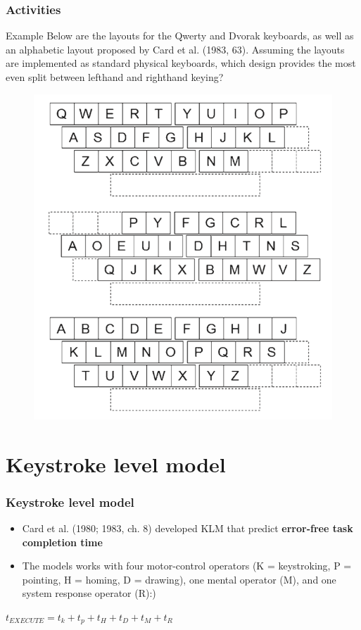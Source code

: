 \documentclass{beamer}
\begin{document}
\begin{frame}
\frametitle{Activities}
\begin{block}{Example}
	\footnotesize
	Below are the layouts for the Qwerty and Dvorak keyboards, as well as an alphabetic layout proposed by Card et al. (1983, 63). Assuming the layouts are implemented as standard physical keyboards, which design provides the most even split between lefthand and righthand keying?
\end{block}
	\begin{figure}
		\centering
		\includegraphics[width=.3\linewidth]{image/leftright}
	\end{figure}
\end{frame}

\section{Keystroke level model}

\begin{frame}
	\frametitle{Keystroke level model}
	\begin{itemize}
		\item Card et al. (1980; 1983, ch. 8) developed KLM that predict \textbf{error-free task completion time} 
		\item The models works with four motor-control operators (K = keystroking, P = pointing, H = homing, D = drawing), one mental operator (M), and one system response operator (R):)
	\end{itemize}
	\centering
	$t_{EXECUTE} = t_{k} + t_{p} + t_{H} + t_{D} + t_{M} + t_{R}$
\end{frame}
\end{document}
